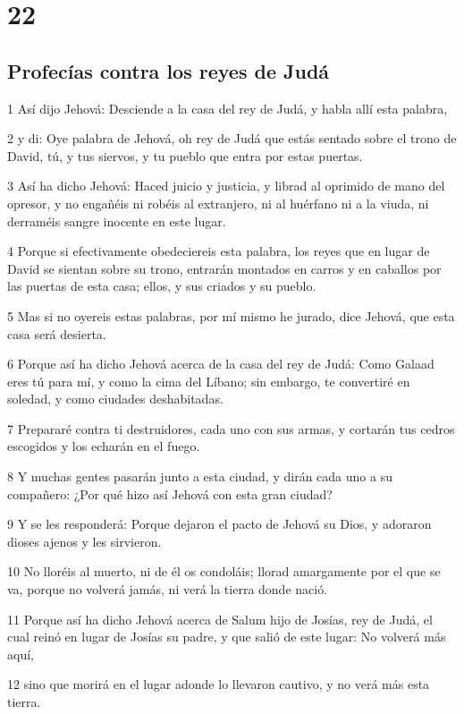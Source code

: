 \chapter{22}

\section*{Profecías contra los reyes de Judá}

\par 1 Así dijo Jehová: Desciende a la casa del rey de Judá, y habla allí esta palabra,
\par 2 y di: Oye palabra de Jehová, oh rey de Judá que estás sentado sobre el trono de David, tú, y tus siervos, y tu pueblo que entra por estas puertas.
\par 3 Así ha dicho Jehová: Haced juicio y justicia, y librad al oprimido de mano del opresor, y no engañéis ni robéis al extranjero, ni al huérfano ni a la viuda, ni derraméis sangre inocente en este lugar.
\par 4 Porque si efectivamente obedeciereis esta palabra, los reyes que en lugar de David se sientan sobre su trono, entrarán montados en carros y en caballos por las puertas de esta casa; ellos, y sus criados y su pueblo.
\par 5 Mas si no oyereis estas palabras, por mí mismo he jurado, dice Jehová, que esta casa será desierta.
\par 6 Porque así ha dicho Jehová acerca de la casa del rey de Judá: Como Galaad eres tú para mí, y como la cima del Líbano; sin embargo, te convertiré en soledad, y como ciudades deshabitadas.
\par 7 Prepararé contra ti destruidores, cada uno con sus armas, y cortarán tus cedros escogidos y los echarán en el fuego.
\par 8 Y muchas gentes pasarán junto a esta ciudad, y dirán cada uno a su compañero: ¿Por qué hizo así Jehová con esta gran ciudad?
\par 9 Y se les responderá: Porque dejaron el pacto de Jehová su Dios, y adoraron dioses ajenos y les sirvieron.
\par 10 No lloréis al muerto, ni de él os condoláis; llorad amargamente por el que se va, porque no volverá jamás, ni verá la tierra donde nació.
\par 11 Porque así ha dicho Jehová acerca de Salum hijo de Josías, rey de Judá, el cual reinó en lugar de Josías su padre, y que salió de este lugar: No volverá más aquí,
\par 12 sino que morirá en el lugar adonde lo llevaron cautivo, y no verá más esta tierra.
